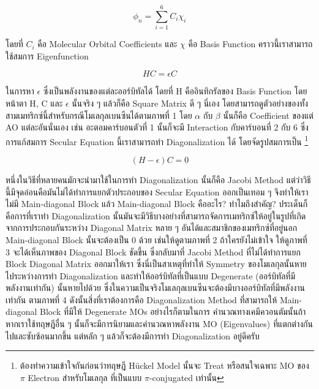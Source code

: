 \begin{equation}
  \phi_{n} = \sum_{i=1}^{6} C_{i} \chi_{i}
\end{equation}

\noindent โดยที่ $C_{i}$ คือ Molecular Orbital Coefficients และ $\chi$ คือ Basis Function คราวนี้เราสามารถใช้สมการ
Eigenfunction

\begin{equation}
  HC = \epsilon C
\end{equation}

\noindent ในการหา $\epsilon$ ซึ่งเป็นพลังงานของแต่ละออร์บิทัลได้ โดยที่ H คืออินทิกรัลของ Basis Function โดยหน้าตา H, C และ
$\epsilon$ นั้นจริง ๆ แล้วก็คือ Square Matrix ดี ๆ นี่เอง โดยสามารถดูตัวอย่างของทั้งสามเมทริกซ์นี้สำหรับกรณีโมเลกุลเบนซีนได้ตามภาพที่ 1
โดย $\alpha$ กับ $\beta$ นั้นก็คือ Coefficient ของแต่ AO แต่ละอันนั่นเอง เช่น อะตอมคาร์บอนตัวที่ 1 นั้นก็จะมี Interaction
กับคาร์บอนที่ 2 กับ 6 ซึ่งการแก้สมการ Secular Equation นี้เราสามารถทำ Diagonalization ได้ โดยจัดรูปสมการเป็น%
\footnote{ต้องทำความเข้าใจกันก่อนว่าทฤษฎี H\"{u}ckel Model นั้นจะ Treat หรือสนใจเฉพาะ MO ของ $\pi$ Electron สำหรับโมเลกุล%
ที่เป็นแบบ $\pi$-conjugated เท่านั้น}

\begin{equation}
  (H - \epsilon)C = 0
\end{equation}

หนึ่งในวิธีที่หลายคนมักจะนำมาใช้ในการทำ Diagonalization นั้นก็คือ Jacobi Method แต่ว่าวิธีนี้มีจุดอ่อนคือมันไม่ได้ทำการแยกตัวประกอบของ
Secular Equation ออกเป็นเทอม ๆ จึงทำให้เราไม่มี Main-diagonal Block แล้ว Main-diagonal Block คืออะไร? ทำไมถึงสำคัญ?
ประเด็นก็คือการที่เราทำ Diagonalization นั้นมันจะมีวิธีบางอย่างที่สามารถจัดการเมทริกซ์ให้อยู่ในรูปที่เกิดจากการประกอบกันระหว่าง Diagonal
Matrix หลาย ๆ อันได้และสมาชิกของเมทริกซ์ที่อยู่นอก Main-diagonal Block นั้นจะต้องเป็น 0 ด้วย เช่นให้ดูตามภาพที่ 2 ถ้าใครยังไม่เข้าใจ%
ให้ดูภาพที่ 3 จะได้เห็นภาพของ Diagonal Block ชัดขึ้น ซึ่งกลับมาที่ Jacobi Method ที่ไม่ได้ทำการแยก Block Diagonal Matrix
ออกมาให้เรา ซึ่งนี่เป็นสาเหตุที่ทำให้ Symmetry ของโมเลกุลนั้นหายไประหว่างการทำ Diagonalization และทำให้ออร์บิทัลที่เป็นแบบ Degenerate
(ออร์บิทัลที่มีพลังงานเท่ากัน) นั้นหายไปด้วย ซึ่งในความเป็นจริงโมเลกุลเบนซีนจะต้องมีบางออร์บิทัลที่มีพลังงานเท่ากัน ตามภาพที่ 4
ดังนั้นสิ่งที่เราต้องการคือ Diagonalization Method ที่สามารถให้ Main-diagonal Block ที่มีให้ Degenerate MOs อย่างไรก็ตามในการ%
คำนวณทางเคมีควอนตัมนั้นถ้าหากเราใช้ทฤษฎีอื่น ๆ นั้นก็จะมีการนิยามและคำนวณหาพลังงาน MO (Eigenvalues) ที่แตกต่างกันไปและซับซ้อนมากขึ้น
แต่หลัก ๆ แล้วก็จะต้องมีการทำ Diagonalization อยู่ดีครับ

